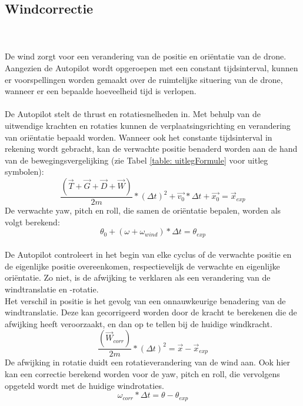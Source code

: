 \subsection{Windcorrectie}
\\
\\
De wind zorgt voor een verandering van de positie en ori\"entatie van de drone. Aangezien de Autopilot wordt opgeroepen met een constant tijdsinterval, kunnen er voorspellingen worden gemaakt over de ruimtelijke situering van de drone, wanneer er een bepaalde hoeveelheid tijd is verlopen.
\\
\\
De Autopilot stelt de thrust en rotatiesnelheden in. Met behulp van de uitwendige krachten en rotaties kunnen de verplaatsingsrichting en verandering van ori\"entatie bepaald worden. Wanneer ook het constante tijdsinterval in rekening wordt gebracht, kan de verwachte positie benaderd worden aan de hand van de bewegingsvergelijking (zie Tabel \ref{table: uitlegFormule} voor uitleg symbolen):
\begin{equation}
	 \frac{(\vec{T} + \vec{G} + \vec{D} + \vec{W}) }{2m} * (\Delta t)^2 + \vec{v_0} * \Delta t + \vec{x_0} = \vec{x}_{exp}
\end{equation}
De verwachte yaw, pitch en roll, die samen de ori\"entatie bepalen, worden als volgt berekend:
\begin{equation}
	\theta_0 + (\omega + \omega_{wind})*\Delta t = \theta_{exp}
\end{equation}
\\
De Autopilot controleert in het begin van elke cyclus of de verwachte positie en de eigenlijke positie overeenkomen, respectievelijk de verwachte en eigenlijke ori\"entatie. Zo niet, is de afwijking te verklaren als een verandering van de windtranslatie en -rotatie. 
\\
Het verschil in positie is het gevolg van een onnauwkeurige benadering van de windtranslatie. Deze kan gecorrigeerd worden door de kracht te berekenen die de afwijking heeft veroorzaakt, en dan op te tellen bij de huidige windkracht.
\begin{equation}
	\frac{(\vec{W}_{corr}) }{2m} * (\Delta t)^2 = \vec{x}-\vec{x}_{exp}
\end{equation}
De afwijking in rotatie duidt een rotatieverandering van de wind aan. Ook hier kan een correctie berekend worden voor de yaw, pitch en roll, die vervolgens opgeteld wordt met de huidige windrotaties.
\begin{equation}
	\omega_{corr}*\Delta t = \theta-\theta_{exp}
\end{equation}
